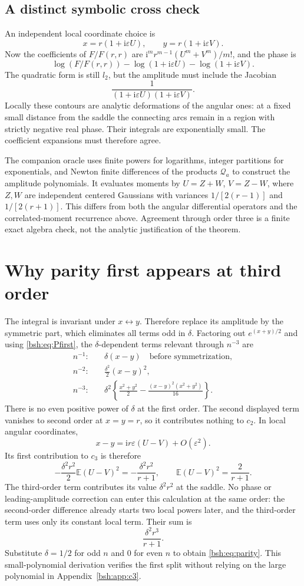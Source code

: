 \documentclass[11pt,letterpaper]{article}
\theoremstyle{remark}\newtheorem{remark}[theorem]{Remark}
\newcommand{\E}{\mathbb E}
\newcommand{\ii}{\mathrm i}
\begin{document}
\subsection{A distinct symbolic cross check}
An independent local coordinate choice is
\[
 x=r(1+\ii\varepsilon U),\qquad y=r(1+\ii\varepsilon V).
\]
Now the coefficients of $F/F(r,r)$ are $\ii^m r^{m-1}(U^m+V^m)/m!$, and the phase is
\[
 \log(F/F(r,r))-\log(1+\ii\varepsilon U)-\log(1+\ii\varepsilon V).
\]
The quadratic form is still $l_2$, but the amplitude must include the Jacobian
\[
 \frac1{(1+\ii\varepsilon U)(1+\ii\varepsilon V)}.
\]
Locally these contours are analytic deformations of the angular ones: at a fixed small distance from the saddle the connecting arcs remain in a region with strictly negative real phase. Their integrals are exponentially small. The coefficient expansions must therefore agree.

The companion oracle uses finite powers for logarithms, integer partitions for exponentials, and Newton finite differences of the products $\mathcal Q_a$ to construct the amplitude polynomials. It evaluates moments by $U=Z+W$, $V=Z-W$, where $Z,W$ are independent centered Gaussians with variances $1/[2(r-1)]$ and $1/[2(r+1)]$. This differs from both the angular differential operators and the correlated-moment recurrence above. Agreement through order three is a finite exact algebra check, not the analytic justification of the theorem.

\section{Why parity first appears at third order}\label{bsh:sec:parity}
The integral is invariant under $x\leftrightarrow y$. Therefore replace its amplitude by the symmetric part, which eliminates all terms odd in $\delta$. Factoring out $e^{(x+y)/2}$ and using \eqref{bsh:eq:Pfirst}, the $\delta$-dependent terms relevant through $n^{-3}$ are
\begin{align*}
 n^{-1}:&\quad \delta(x-y) \quad\text{before symmetrization},\\
 n^{-2}:&\quad \frac{\delta^2}{2}(x-y)^2,\\
 n^{-3}:&\quad \delta^2\left\{\frac{x^2+y^2}{2}
                    -\frac{(x-y)^2(x^2+y^2)}{16}\right\}.
\end{align*}
There is no even positive power of $\delta$ at the first order. The second displayed term vanishes to second order at $x=y=r$, so it contributes nothing to $c_2$. In local angular coordinates,
\[
 x-y=\ii r\varepsilon(U-V)+O(\varepsilon^2).
\]
Its first contribution to $c_3$ is therefore
\[
 -\frac{\delta^2r^2}{2}\E(U-V)^2
 =-\frac{\delta^2r^2}{r+1},
 \qquad \E(U-V)^2=\frac2{r+1}.
\]
The third-order term contributes its value $\delta^2r^2$ at the saddle. No phase or leading-amplitude correction can enter this calculation at the same order: the second-order difference already starts two local powers later, and the third-order term uses only its constant local term. Their sum is
\[
 \frac{\delta^2r^3}{r+1}.
\]
Substitute $\delta=1/2$ for odd $n$ and $0$ for even $n$ to obtain \eqref{bsh:eq:parity}. This small-polynomial derivation verifies the first split without relying on the large polynomial in Appendix~\ref{bsh:app:c3}.
\end{document}
